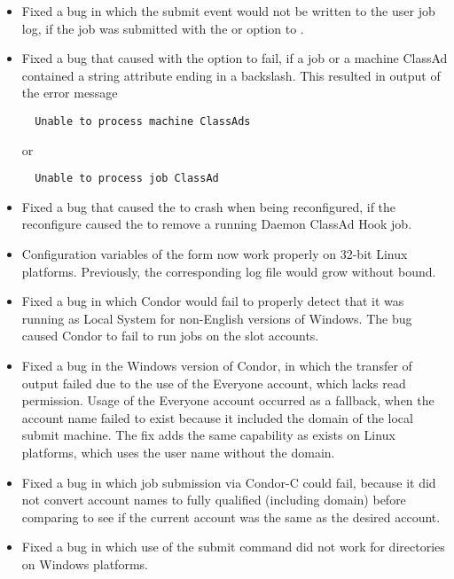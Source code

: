 \begin{itemize}
\item Fixed a bug in which the submit event would not be written to the user
job log,
if the job was submitted with the  or  option to
.

\item Fixed a bug that caused  with the  option
to fail,
if a job or a machine ClassAd contained a string attribute ending in 
a backslash.
This resulted in output of the error message
\begin{verbatim}
  Unable to process machine ClassAds
\end{verbatim}
or
\begin{verbatim}
  Unable to process job ClassAd
\end{verbatim}

\item Fixed a bug that caused the  to crash when being
reconfigured,
if the reconfigure caused the  to remove 
a running Daemon ClassAd Hook job.

\item Configuration variables of the form 
now work properly on 32-bit Linux platforms.
Previously, the corresponding log file would grow without bound.

\item Fixed a bug in which Condor would fail to properly detect that it 
was running as Local System for non-English versions of Windows.
The bug caused Condor to fail to run jobs on the slot accounts.

\item Fixed a bug in the Windows version of Condor,
in which the transfer of output failed due to the use of the Everyone account,
which lacks read permission.
Usage of the Everyone account occurred as a fallback,
when the account name failed to exist because it
included the domain of the local submit machine.
The fix adds the same capability as exists on Linux platforms,
which uses the user name without the domain.

\item Fixed a bug in which job submission via Condor-C could fail,
because it did not convert account names to fully qualified (including domain)
before comparing to see
if the current account was the same as the desired account.

\item Fixed a bug in which use of the submit command 
 did not work for directories on 
Windows platforms.


\end{itemize}
